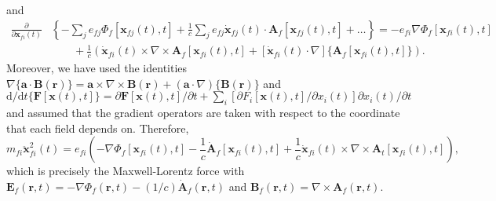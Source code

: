 \documentclass{article}
\begin{document}
and
\begin{equation}
\begin{split}
\frac{\partial}{\partial \mathbf{x}_{fi}(t)}&\left\{-\sum_je_{fj}\Phi_f[\mathbf{x}_{fj}(t),t] + \frac{1}{c}\sum_je_{fj}\dot{\mathbf{x}}_{fj}(t)\cdot\mathbf{A}_f[\mathbf{x}_{fj}(t),t] + \ldots\right\} = -e_{fi}\nabla\Phi_f[\mathbf{x}_{fi}(t),t]\\
&\qquad + \frac{1}{c}\left(\dot{\mathbf{x}}_{fi}(t)\times\nabla\times\mathbf{A}_f[\mathbf{x}_{fi}(t),t] + \left[\dot{\mathbf{x}}_{fi}(t)\cdot\nabla\right]\{\mathbf{A}_f[\mathbf{x}_{fi}(t),t]\}\right).
\end{split}
\end{equation}
Moreover, we have used the identities $\nabla\{\mathbf{a}\cdot\mathbf{B}(\mathbf{r})\} = \mathbf{a}\times\nabla\times\mathbf{B}(\mathbf{r}) + (\mathbf{a}\cdot\nabla)\{\mathbf{B}(\mathbf{r})\}$ and $\mathrm{d}/\mathrm{d}t\{\mathbf{F}[\mathbf{x}(t),t]\} = \partial\mathbf{F}[\mathbf{x}(t),t]/\partial t + \sum_i[\partial F_i[\mathbf{x}(t),t]/\partial x_i(t)]\partial x_i(t)/\partial t $ and assumed that the gradient operators are taken with respect to the coordinate that each field depends on. Therefore,
\begin{equation}
m_{fi}\ddot{\mathbf{x}}_{fi}^2(t) = e_{fi}\left(-\nabla\Phi_f[\mathbf{x}_{fi}(t),t] - \frac{1}{c}\dot{\mathbf{A}}_f[\mathbf{x}_{fi}(t),t] + \frac{1}{c}\dot{\mathbf{x}}_{fi}(t)\times\nabla\times\mathbf{A}_t[\mathbf{x}_{fi}(t),t]\right),
\end{equation}
which is precisely the Maxwell-Lorentz force with $\mathbf{E}_f(\mathbf{r},t) = -\nabla\Phi_f(\mathbf{r},t) - (1/c)\dot{\mathbf{A}}_f(\mathbf{r},t)$ and $\mathbf{B}_f(\mathbf{r},t) = \nabla\times\mathbf{A}_f(\mathbf{r},t)$.
\end{document}
